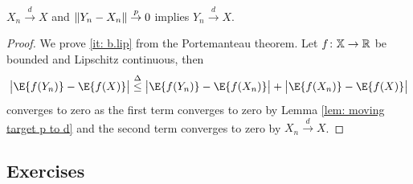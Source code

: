 \begin{lemma}
    \label{lem: pull along}
    \(X_n \overset{d}\to X\) and \(\lVert Y_n - X_n\rVert \overset{p}\to 0\) implies \(Y_n \overset{d}\to X\).
\end{lemma}
\begin{proof}
    We prove \ref{it: b.lip} from the Portemanteau theorem.
    Let \(f\colon \mathbb{X} \to \mathbb{R}\) be bounded and Lipschitz continuous, then
    \[
        \abs[\big]{\E{f(Y_n)} - \E{f(X)}}
        \overset{\Delta}\le \abs[\big]{\E{f(Y_n)} - \E{f(X_n)}} + \abs[\big]{\E{f(X_n)} - \E{f(X)}}
    \]
    converges to zero as the first term converges to zero by Lemma \ref{lem:
    moving target p to d} and the second term converges to zero by \(X_n
    \overset{d}\to X\).
\end{proof}


\subsection*{Exercises \thesection}








